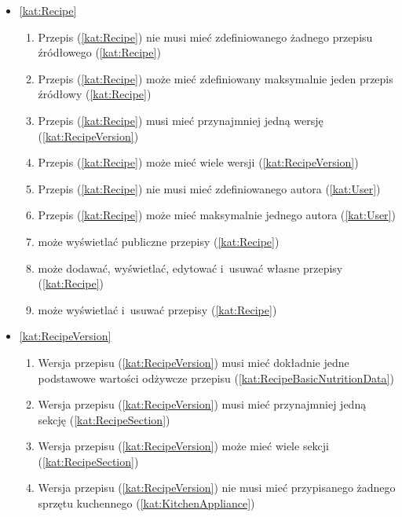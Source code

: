 \begin{itemize}[label={\textbf{Reguły dla}}, wide, labelwidth=!, labelindent=0pt]
    \setlength\itemsep{1.75em}
    \item\ref{kat:Recipe}\mynobreakpar
    \begin{enumerate}[label={\textbf{REG/3/\protect\twodigits{\arabic{enumi}}}}, wide, labelwidth=!, align=left, leftmargin=3cm]
        \item Przepis (\ref{kat:Recipe}) nie musi mieć zdefiniowanego żadnego przepisu źródłowego (\ref{kat:Recipe})
        \item Przepis (\ref{kat:Recipe}) może mieć zdefiniowany maksymalnie jeden przepis źródłowy (\ref{kat:Recipe})
        \item Przepis (\ref{kat:Recipe}) musi mieć przynajmniej jedną wersję (\ref{kat:RecipeVersion})
        \item Przepis (\ref{kat:Recipe}) może mieć wiele wersji (\ref{kat:RecipeVersion})
        \item Przepis (\ref{kat:Recipe}) nie musi mieć zdefiniowanego autora (\ref{kat:User})
        \item Przepis (\ref{kat:Recipe}) może mieć maksymalnie jednego autora (\ref{kat:User})
        \item {} może wyświetlać publiczne przepisy (\ref{kat:Recipe})
        \item {} może dodawać, wyświetlać, edytować i~usuwać własne przepisy (\ref{kat:Recipe})
        \item {} może wyświetlać i~usuwać przepisy (\ref{kat:Recipe})
    \end{enumerate}
    \item\ref{kat:RecipeVersion}\mynobreakpar
    \begin{enumerate}[label={\textbf{REG/3/\protect\twodigits{\arabic{enumi}}}}, wide, labelwidth=!, align=left, leftmargin=3cm, resume]
        \item Wersja przepisu (\ref{kat:RecipeVersion}) musi mieć dokładnie jedne podstawowe wartości odżywcze przepisu (\ref{kat:RecipeBasicNutritionData})
        \item Wersja przepisu (\ref{kat:RecipeVersion}) musi mieć przynajmniej jedną sekcję (\ref{kat:RecipeSection})
        \item Wersja przepisu (\ref{kat:RecipeVersion}) może mieć wiele sekcji (\ref{kat:RecipeSection})
        \item Wersja przepisu (\ref{kat:RecipeVersion}) nie musi mieć przypisanego żadnego sprzętu kuchennego (\ref{kat:KitchenAppliance})

\end{enumerate}
\end{itemize}
